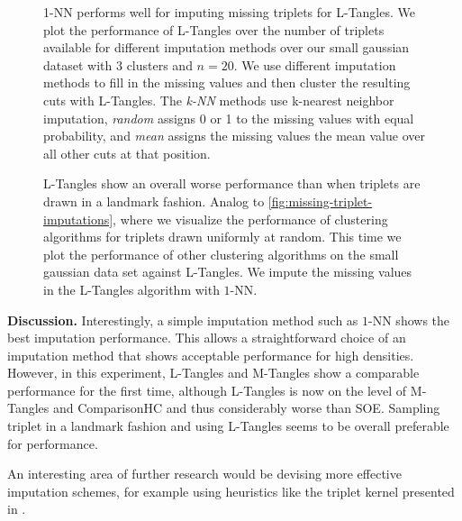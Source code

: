 \begin{figure}[ht]
    \centering
    \resizebox{0.6\textwidth}{!}{}
    \caption{
        1-NN performs well for imputing missing triplets for L-Tangles.
        We plot the performance of L-Tangles over the number of triplets available for different imputation methods over our small gaussian dataset with $3$ clusters
        and $n=20$. We use different imputation methods to fill in the missing values and then cluster the resulting cuts with L-Tangles.
        The \textit{k-NN} methods use k-nearest neighbor imputation, \textit{random} assigns 0 or 1 to the missing values with equal probability, and \textit{mean} assigns the missing
        values the mean value over all other cuts at that position.
    }
    \label{fig:missing-triplet-imputations}
\end{figure}

\begin{figure}[ht]
    \centering
    \resizebox{0.6\textwidth}{!}{}
    \caption{
        L-Tangles show an overall worse performance than when triplets are drawn in a landmark fashion.
        Analog to \autoref{fig:missing-triplet-imputations}, where we visualize the performance of clustering algorithms for triplets drawn uniformly at random. 
        This time we plot the performance of other clustering algorithms on the small gaussian data set against L-Tangles.
        We impute the missing values in the L-Tangles algorithm with $1$-NN.
    }
    \label{fig:missing-triplet-performance}
\end{figure}

\noindent
\textbf{Discussion.}
Interestingly, a simple imputation method such as $1$-NN shows the best imputation performance. This allows a straightforward choice of an imputation method that shows acceptable
performance for high densities. However, in this experiment, L-Tangles and M-Tangles show a comparable performance for the first time, although L-Tangles is now on the level of M-Tangles 
and ComparisonHC and thus considerably worse than SOE. Sampling triplet in a landmark fashion and using L-Tangles seems to be overall preferable for performance.

An interesting area of further research would be devising more effective imputation schemes, for example using heuristics like the
triplet kernel presented in \cite{kleindessnerKernelFunctionsBased2017}.



